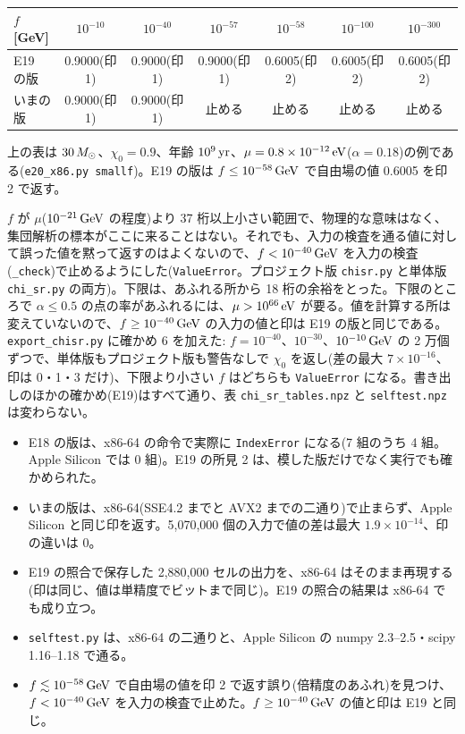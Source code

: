 \begin{center}\small
\begin{tabular}{lcccccc}
\toprule
$f$ [GeV] & $10^{-10}$ & $10^{-40}$ & $10^{-57}$ & $10^{-58}$ & $10^{-100}$ & $10^{-300}$\\
\midrule
E19 の版 & 0.9000(印 1) & 0.9000(印 1) & 0.9000(印 1) & 0.6005(印 2) & 0.6005(印 2) & 0.6005(印 2)\\
いまの版 & 0.9000(印 1) & 0.9000(印 1) & 止める & 止める & 止める & 止める\\
\bottomrule
\end{tabular}
\end{center}
上の表は $30\,M_\odot$、$\chi_0=0.9$、年齢 $10^9\,\mathrm{yr}$、$\mu=0.8\times10^{-12}\,\mathrm{eV}$($\alpha=0.18$)の例である(\texttt{e20\_x86.py smallf})。E19 の版は $f\le10^{-58}\,\mathrm{GeV}$ で自由場の値 0.6005 を印 2 で返す。

$f$ が $\mu$($10^{-21}\,\mathrm{GeV}$ の程度)より 37 桁以上小さい範囲で、物理的な意味はなく、集団解析の標本がここに来ることはない。それでも、入力の検査を通る値に対して誤った値を黙って返すのはよくないので、$f<10^{-40}\,\mathrm{GeV}$ を入力の検査(\texttt{\_check})で止めるようにした(\texttt{ValueError}。プロジェクト版 \texttt{chisr.py} と単体版 \texttt{chi\_sr.py} の両方)。下限は、あふれる所から 18 桁の余裕をとった。下限のところで $\alpha\le0.5$ の点の率があふれるには、$\mu>10^{66}\,\mathrm{eV}$ が要る。値を計算する所は変えていないので、$f\ge10^{-40}\,\mathrm{GeV}$ の入力の値と印は E19 の版と同じである。\texttt{export\_chisr.py} に確かめ 6 を加えた: $f=10^{-40}$、$10^{-30}$、$10^{-10}\,\mathrm{GeV}$ の 2 万個ずつで、単体版もプロジェクト版も警告なしで $\chi_0$ を返し(差の最大 $7\times10^{-16}$、印は 0・1・3 だけ)、下限より小さい $f$ はどちらも \texttt{ValueError} になる。書き出しのほかの確かめ(E19)はすべて通り、表 \texttt{chi\_sr\_tables.npz} と \texttt{selftest.npz} は変わらない。

\begin{result}
\begin{itemize}
\item E18 の版は、x86-64 の命令で実際に \texttt{IndexError} になる(7 組のうち 4 組。Apple Silicon では 0 組)。E19 の所見 2 は、模した版だけでなく実行でも確かめられた。
\item いまの版は、x86-64(SSE4.2 までと AVX2 までの二通り)で止まらず、Apple Silicon と同じ印を返す。5{,}070{,}000 個の入力で値の差は最大 $1.9\times10^{-14}$、印の違いは 0。
\item E19 の照合で保存した 2{,}880{,}000 セルの出力を、x86-64 はそのまま再現する(印は同じ、値は単精度でビットまで同じ)。E19 の照合の結果は x86-64 でも成り立つ。
\item \texttt{selftest.py} は、x86-64 の二通りと、Apple Silicon の numpy 2.3--2.5・scipy 1.16--1.18 で通る。
\item $f\lesssim10^{-58}\,\mathrm{GeV}$ で自由場の値を印 2 で返す誤り(倍精度のあふれ)を見つけ、$f<10^{-40}\,\mathrm{GeV}$ を入力の検査で止めた。$f\ge10^{-40}\,\mathrm{GeV}$ の値と印は E19 と同じ。
\end{itemize}
\end{result}

